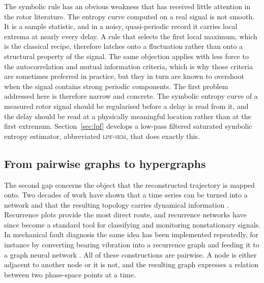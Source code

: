 \documentclass[10pt,a4paper,twocolumn]{article}
\newcommand{\lpf}{\textsc{lpf-sem}}
\begin{document}
The symbolic rule has an obvious weakness that has received little attention
in the rotor literature.  The entropy curve computed on a real signal is not
smooth.  It is a sample statistic, and in a noisy, quasi-periodic record it
carries local extrema at nearly every delay.  A rule that selects the first
local maximum, which is the classical recipe, therefore latches onto a
fluctuation rather than onto a structural property of the signal.  The same
objection applies with less force to the autocorrelation and mutual
information criteria, which is why those criteria are sometimes preferred in
practice, but they in turn are known to overshoot when the signal contains
strong periodic components.  The first problem addressed here is therefore
narrow and concrete.  The symbolic entropy curve of a measured rotor signal
should be regularised before a delay is read from it, and the delay should be
read at a physically meaningful location rather than at the first extremum.
Section~\ref{sec:lpf} develops a low-pass filtered saturated symbolic entropy
estimator, abbreviated \lpf, that does exactly this.

\subsection{From pairwise graphs to hypergraphs}

The second gap concerns the object that the reconstructed trajectory is
mapped onto.  Two decades of work have shown that a time series can be turned
into a network and that the resulting topology carries dynamical information
\citep{zhang2006,xu2008,donner2010}.  Recurrence plots
\citep{eckmann1987,marwan2007} provide the most direct route, and recurrence
networks have since become a standard tool for classifying and monitoring
nonstationary signals.  In mechanical fault diagnosis the same idea has been
implemented repeatedly, for instance by converting bearing vibration into a
recurrence graph and feeding it to a graph neural network
\citep{yuan2023sen,yuan2023}.  All of these constructions are pairwise.  A
node is either adjacent to another node or it is not, and the resulting graph
expresses a relation between two phase-space points at a time.
\end{document}
